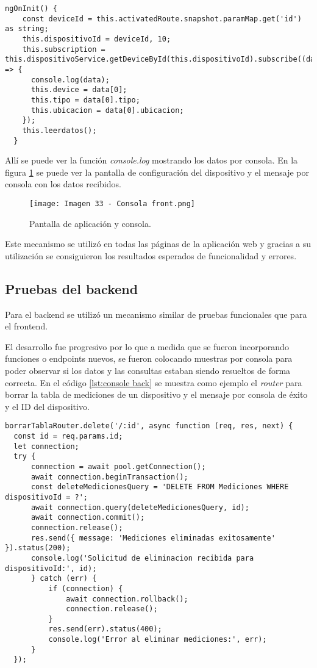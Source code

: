 \begin{lstlisting}[caption={Muestra por consola de los datos recibidos}, label={console front}]
ngOnInit() {
    const deviceId = this.activatedRoute.snapshot.paramMap.get('id') as string;
    this.dispositivoId = deviceId, 10;
    this.subscription = this.dispositivoService.getDeviceById(this.dispositivoId).subscribe((data) => {
      console.log(data);
      this.device = data[0];
      this.tipo = data[0].tipo;
      this.ubicacion = data[0].ubicacion;
    });
    this.leerdatos();
  }
\end{lstlisting}

Allí se puede ver la función \textit{console.log} mostrando los datos por consola. En la figura \ref{fig:33} se puede ver la pantalla de configuración del dispositivo y el mensaje por consola con los datos recibidos.

\begin{figure}[h]
\centering
\texttt{[image: Imagen 33 - Consola front.png]}
\caption[Prueba frontend]{Pantalla de aplicación y consola.}
\label{fig:33}
\end{figure}

Este mecanismo se utilizó en todas las páginas de la aplicación web y gracias a su utilización se consiguieron los resultados esperados de funcionalidad y errores.

\subsection{Pruebas del backend}

Para el backend se utilizó un mecanismo similar de pruebas funcionales que para el frontend.

El desarrollo fue progresivo por lo que a medida que se fueron incorporando funciones o endpoints nuevos, se fueron colocando muestras por consola para poder observar si los datos y las consultas estaban siendo resueltos de forma correcta. En el código \ref{lst:console back} se muestra como ejemplo el \textit{router} para borrar la tabla de mediciones de un dispositivo y el mensaje por consola de éxito y el ID del dispositivo.

\begin{lstlisting}[caption={Muestra por consola de los datos consultados}, label={console back}]
borrarTablaRouter.delete('/:id', async function (req, res, next) {
  const id = req.params.id;
  let connection;
  try {
      connection = await pool.getConnection();
      await connection.beginTransaction();
      const deleteMedicionesQuery = 'DELETE FROM Mediciones WHERE dispositivoId = ?';
      await connection.query(deleteMedicionesQuery, id);
      await connection.commit();
      connection.release();
      res.send({ message: 'Mediciones eliminadas exitosamente' }).status(200);
      console.log('Solicitud de eliminacion recibida para dispositivoId:', id);
      } catch (err) {
          if (connection) {
              await connection.rollback();
              connection.release();
          }
          res.send(err).status(400);
          console.log('Error al eliminar mediciones:', err);
      }
  });
\end{lstlisting}

